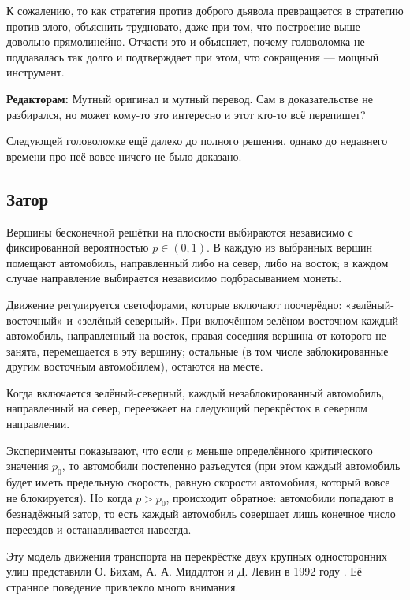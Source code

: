 К сожалению, то как стратегия против доброго дьявола превращается в стратегию против злого, объяснить трудновато, даже при том, что построение выше довольно прямолинейно.
Отчасти это и объясняет, почему головоломка не поддавалась так долго и подтверждает при этом, что сокращения --- мощный инструмент.

\begin{addedbytheeditors}
\textbf{Редакторам:} Мутный оригинал и мутный перевод. Сам в доказательстве не разбирался, но может кому-то это интересно и этот кто-то всё перепишет?
\end{addedbytheeditors}


\medskip

Следующей головоломке ещё далеко до полного решения,
однако до недавнего времени про неё вовсе ничего не было доказано.

\subsection*{Затор}

Вершины бесконечной решётки на плоскости выбираются независимо с
фиксированной вероятностью $p\in (0,1)$.
В каждую из выбранных вершин
помещают автомобиль, направленный либо на север, либо на восток;
в каждом случае направление выбирается независимо подбрасыванием монеты.

Движение регулируется светофорами, которые включают поочерёдно:
«зелёный-восточный» и «зелёный-северный».
При включённом
зелёном-восточном каждый автомобиль, направленный на восток, правая
соседняя вершина от которого не занята, перемещается в эту вершину;
остальные (в том числе заблокированные другим восточным автомобилем),
остаются на месте.

Когда включается зелёный-северный, каждый незаблокированный
автомобиль, направленный на север, переезжает на следующий перекрёсток в
северном направлении.

Эксперименты показывают, что если $p$ меньше определённого
критического значения $p_0$, то автомобили постепенно разъедутся
(при этом каждый автомобиль будет иметь предельную скорость,
равную скорости автомобиля, который вовсе не блокируется).
Но когда
$p> p_0$, происходит обратное: автомобили попадают в безнадёжный
затор, то есть каждый автомобиль совершает лишь конечное число переездов
и останавливается навсегда.

Эту модель движения транспорта на перекрёстке двух крупных односторонних улиц представили О. Бихам, А. А. Миддлтон и Д. Левин в 1992 году \cite{6}.
Её странное поведение привлекло много внимания.

